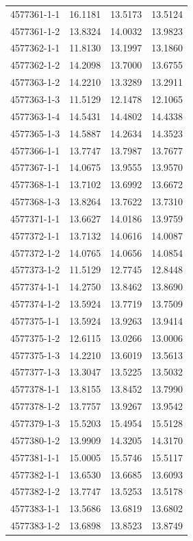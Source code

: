 \begin{longtable}{lrrr}
4577361-1-1 & 16.1181 & 13.5173 & 13.5124 \\
4577361-1-2 & 13.8324 & 14.0032 & 13.9823 \\
4577362-1-1 & 11.8130 & 13.1997 & 13.1860 \\
4577362-1-2 & 14.2098 & 13.7000 & 13.6755 \\
4577363-1-2 & 14.2210 & 13.3289 & 13.2911 \\
4577363-1-3 & 11.5129 & 12.1478 & 12.1065 \\
4577363-1-4 & 14.5431 & 14.4802 & 14.4338 \\
4577365-1-3 & 14.5887 & 14.2634 & 14.3523 \\
4577366-1-1 & 13.7747 & 13.7987 & 13.7677 \\
4577367-1-1 & 14.0675 & 13.9555 & 13.9570 \\
4577368-1-1 & 13.7102 & 13.6992 & 13.6672 \\
4577368-1-3 & 13.8264 & 13.7622 & 13.7310 \\
4577371-1-1 & 13.6627 & 14.0186 & 13.9759 \\
4577372-1-1 & 13.7132 & 14.0616 & 14.0087 \\
4577372-1-2 & 14.0765 & 14.0656 & 14.0854 \\
4577373-1-2 & 11.5129 & 12.7745 & 12.8448 \\
4577374-1-1 & 14.2750 & 13.8462 & 13.8690 \\
4577374-1-2 & 13.5924 & 13.7719 & 13.7509 \\
4577375-1-1 & 13.5924 & 13.9263 & 13.9414 \\
4577375-1-2 & 12.6115 & 13.0266 & 13.0006 \\
4577375-1-3 & 14.2210 & 13.6019 & 13.5613 \\
4577377-1-3 & 13.3047 & 13.5225 & 13.5032 \\
4577378-1-1 & 13.8155 & 13.8452 & 13.7990 \\
4577378-1-2 & 13.7757 & 13.9267 & 13.9542 \\
4577379-1-3 & 15.5203 & 15.4954 & 15.5128 \\
4577380-1-2 & 13.9909 & 14.3205 & 14.3170 \\
4577381-1-1 & 15.0005 & 15.5746 & 15.5117 \\
4577382-1-1 & 13.6530 & 13.6685 & 13.6093 \\
4577382-1-2 & 13.7747 & 13.5253 & 13.5178 \\
4577383-1-1 & 13.5686 & 13.6819 & 13.6802 \\
4577383-1-2 & 13.6898 & 13.8523 & 13.8749 \\

\end{longtable}
